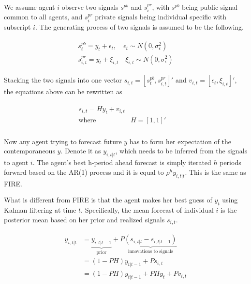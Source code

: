 \documentclass[12pt]{article}
\begin{document}
	We assume agent $i$ observe two signals $s^{pb}$ and $s^{pr}_i$, with $s^{pb}$ being public signal common to all agents, and $s^{pr}_i$ private signals being individual specific with subscript $i$. The generating process of two signals is assumed to be the following.
	
	\begin{eqnarray}\label{NISigDef}
		\begin{aligned}
			s^{pb}_t = y_t + \epsilon_t, \quad \epsilon_t \sim N(0,\sigma^2_\epsilon)\\ 
			s^{pr}_{i,t} = y_t + \xi_{i,t} \quad \xi_{i,t} \sim N(0,\sigma^2_\epsilon)
		\end{aligned}
	\end{eqnarray}
	
	Stacking the two signals into one vector $s_{i,t} = [s^{pb}_t,s^{pr}_{i,t}]'$ and $v_{i,t}= [\epsilon_t,\xi_{i,t}]'$, the equations above can be rewritten as 
	
	\begin{eqnarray}
		\begin{aligned}
			s_{i,t} = H y_{t} + v_{i,t} \\
			\text{where } & H=[1,1]' \quad \\
		\end{aligned}
	\end{eqnarray}
	
	
	Now any agent trying to forecast future $y$ has to form her expectation of the contemporaneous $y$. Denote it as  $y_{i,t|t}$, which needs to be inferred from the signals to agent $i$. The agent's best h-period ahead forecast is simply iterated $h$ periods forward based on the AR(1) process and it is equal to $\rho^h y_{i,t|t}$. This is the same as FIRE.
	
	What is different from FIRE is that the agent makes her best guess of $y_t$ using Kalman filtering at time $t$. Specifically, the mean forecast of individual $i$ is the posterior mean based on her prior and realized signals $s_{i,t}$. 
	
	
	\begin{eqnarray}
		\begin{aligned}
			y_{i,t|t}  
			& =  \underbrace{y_{i,t|t-1}}_{\text{prior}} + P \underbrace {(s_{i,t|t}-s_{i,t|t-1})}_{\text{innovations to signals}} \\
			& = (1-PH) y_{t|t-1} + Ps_{i,t} \\
			& = (1-PH) y_{t|t-1} + PH y_{t} + P v_{i,t} 
		\end{aligned}
	\end{eqnarray}
	
\end{document}
